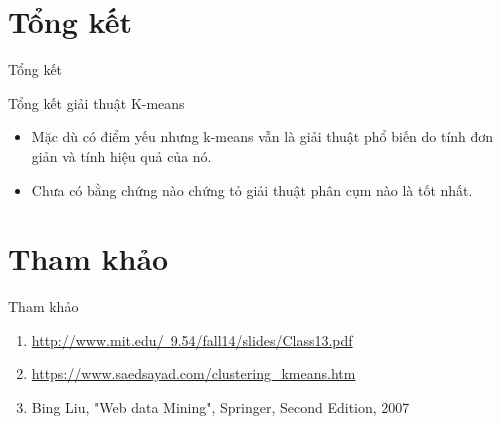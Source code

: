 \documentclass[english,10pt,table]{beamer}
\begin{document}
\section{Tổng kết}
\begin{frame}{Tổng kết}
\begin{block} {Tổng kết giải thuật K-means}
	\begin{itemize}
		\item Mặc dù có điểm yếu nhưng k-means vẫn là giải thuật phổ biến do tính đơn giản và tính hiệu quả của nó.
		\item Chưa có bằng chứng nào chứng tỏ giải thuật phân cụm nào là tốt nhất.
	\end{itemize}
\end{block}
\end{frame}

\section{Tham khảo}
\begin{frame}{Tham khảo}
	\begin{enumerate}
		\item \href{http://www.mit.edu/~9.54/fall14/slides/Class13.pdf}{http://www.mit.edu/~9.54/fall14/slides/Class13.pdf}
		\item \href{https://www.saedsayad.com/clustering_kmeans.htm}{https://www.saedsayad.com/clustering\_kmeans.htm}
		\item Bing Liu, "Web data Mining", Springer, Second Edition, 2007
	\end{enumerate}
\end{frame}
\end{document}
